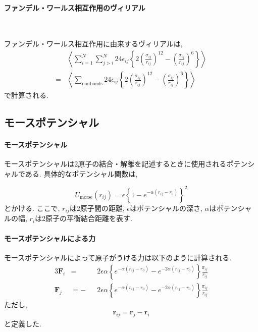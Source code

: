 \paragraph{ファンデル・ワールス相互作用のヴィリアル} \

ファンデル・ワールス相互作用に由来するヴィリアルは, 
\begin{align}
 &\left\langle
  \sum_{i=1}^{N} \sum_{j > i}^{N}
  24 \epsilon_{ij}
  \left\{
        2 \left( \frac{\sigma_{ij}}{r_{ij}} \right)^{12}
        - \left( \frac{\sigma_{ij}}{r_{ij}} \right)^{6}
  \right\}
 \right\rangle
 \\
 =
  &\left\langle
   \sum_{\mathrm{nonbonds}}
   24 \epsilon_{ij}
   \left\{
           2\left( \frac{\sigma_{ij}}{r_{ij}} \right)^{12}
          - \left( \frac{\sigma_{ij}}{r_{ij}} \right)^{6}
   \right\}
   \right\rangle
 \label{eq:BioModel33}
\end{align}
で計算される. 

\clearpage

\subsection{モースポテンシャル}
\paragraph{モースポテンシャル}
モースポテンシャルは2原子の結合・解離を記述するときに使用されるポテンシャルである.
具体的なポテンシャル関数は,

\begin{equation}
   U_{\mathrm{morse}} (r_{ij})
   =
   \epsilon
   \left\{
      1 - e^{-\alpha(r_{ij} - r_{0})}
   \right\}^{2}
\end{equation}
とかける. ここで, $r_{ij}$は2原子間の距離, $\epsilon$はポテンシャルの深さ, $\alpha$はポテンシャルの幅, $r_{i}$は2原子の平衡結合距離を表す.

\paragraph{モースポテンシャルによる力}

モースポテンシャルによって原子がうける力は以下のように計算される.
\begin{alignat}{3}
   \bm{F}_{i}
   &=&&
   2\epsilon \alpha
   \left\{
      e^{-\alpha(r_{ij} - r_{0})}
      -
      e^{-2\alpha(r_{ij} - r_{0})}
   \right\}
   \frac{\bm{r}_{ij}}{r_{ij}}
   \\
   \bm{F}_{j}
   &=
   -&&
   2\epsilon \alpha
   \left\{
      e^{-\alpha(r_{ij} - r_{0})}
      -
      e^{-2\alpha(r_{ij} - r_{0})}
   \right\}
   \frac{\bm{r}_{ij}}{r_{ij}}
\end{alignat}
ただし,
\begin{align}
   \bm{r}_{ij} = \bm{r}_{j} - \bm{r}_{i}
\end{align}
と定義した.

